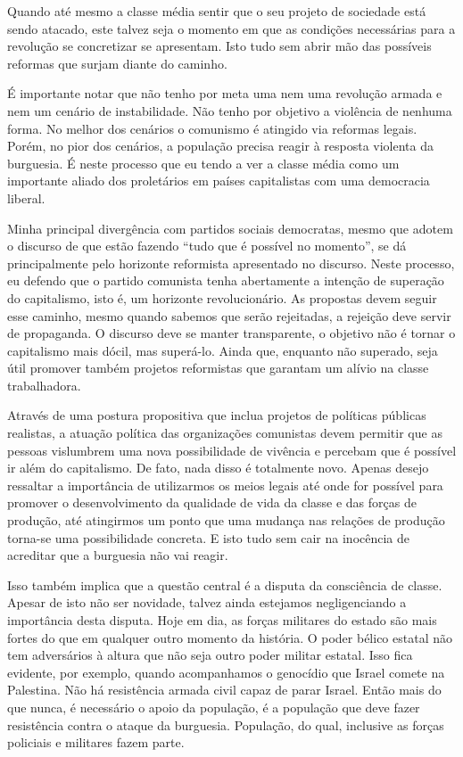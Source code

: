 Quando até mesmo a classe média sentir que o seu projeto de sociedade está sendo atacado, este talvez seja o momento em que as condições necessárias para a revolução se concretizar se apresentam. Isto tudo sem abrir mão das possíveis reformas que surjam diante do caminho.

É importante notar que não tenho por meta uma nem uma revolução armada e nem um cenário de instabilidade. Não tenho por objetivo a violência de nenhuma forma. No melhor dos cenários o comunismo é atingido via reformas legais. Porém, no pior dos cenários, a população precisa reagir à resposta violenta da burguesia. É neste processo que eu tendo a ver a classe média como um importante aliado dos proletários em países capitalistas com uma democracia liberal.

Minha principal divergência com partidos sociais democratas, mesmo que adotem o discurso de que estão fazendo “tudo que é possível no momento”, se dá principalmente pelo horizonte reformista apresentado no discurso. Neste processo, eu defendo que o partido comunista tenha abertamente a intenção de superação do capitalismo, isto é, um horizonte revolucionário. As propostas devem seguir esse caminho, mesmo quando sabemos que serão rejeitadas, a rejeição deve servir de propaganda. O discurso deve se manter transparente, o objetivo não é tornar o capitalismo mais dócil, mas superá-lo. Ainda que, enquanto não superado, seja útil promover também projetos reformistas que garantam um alívio na classe trabalhadora.

Através de uma postura propositiva que inclua projetos de políticas públicas realistas, a atuação política das organizações comunistas devem permitir que as pessoas vislumbrem uma nova possibilidade de vivência e percebam que é possível ir além do capitalismo. De fato, nada disso é totalmente novo. Apenas desejo ressaltar a importância de utilizarmos os meios legais até onde for possível para promover o desenvolvimento da qualidade de vida da classe e das forças de produção, até atingirmos um ponto que uma mudança nas relações de produção torna-se uma possibilidade concreta. E isto tudo sem cair na inocência de acreditar que a burguesia não vai reagir.

Isso também implica que a questão central é a disputa da consciência de classe. Apesar de isto não ser novidade, talvez ainda estejamos negligenciando a importância desta disputa. Hoje em dia, as forças militares do estado são mais fortes do que em qualquer outro momento da história. O poder bélico estatal não tem adversários à altura que não seja outro poder militar estatal. Isso fica evidente, por exemplo, quando acompanhamos o genocídio que Israel comete na Palestina. Não há resistência armada civil capaz de parar Israel. Então mais do que nunca, é necessário o apoio da população, é a população que deve fazer resistência contra o ataque da burguesia. População, do qual, inclusive as forças policiais e militares fazem parte.

